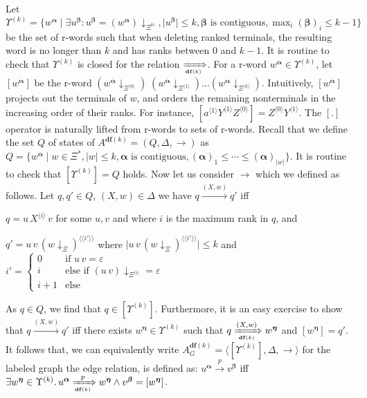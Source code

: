 \documentclass[final]{llncs}
\def\age#1{\left[#1\right]}
\def\tuple#1{{\langle #1 \rangle}}
\def\nats{{\mathbb{N}}}
\def\len#1{{\vert{#1}\vert}}
\def\prod{\Delta}
\def\df#1{\scriptscriptstyle\mathbf{df}(#1)}
\def\Vars{\ensuremath{\Xi}}
\def\rank#1{\langle\!\langle#1\rangle\!\rangle}
\def\bdwords{\Upsilon}
\def\proj{\mathbin{\downarrow}}
\renewcommand{\proj}[2]{{#1}\mathclose{\downarrow}_{{#2}}}
\begin{document}
Let \(\bdwords^{(k)}
= \{w^{\boldsymbol{\alpha}} \mid \exists  u^{\boldsymbol{\beta}}\colon u^{\boldsymbol{\beta}} = \proj{(w^{\boldsymbol{\alpha}})}{\Vars^{\nats}}, \len{u^{\boldsymbol{\beta}}} \leq  k, \boldsymbol{\beta} \text{ is contiguous}, \max_{i} (\boldsymbol{\beta})_i \leq k-1\} \) be the set of r-words such
that when deleting ranked terminals, the resulting word is no longer than \(k\) and has ranks between $0$ and $k-1$. 
It is routine to check that \(\bdwords^{(k)}\) is closed for the relation \(\xRightarrow[\df{k}]{}\).
For a
r-word \(w^{\boldsymbol{\alpha}}\in\bdwords^{(k)}\),
let \(\age{w^{\boldsymbol{\alpha}}}\) be the r-word
\( (\proj{w^{\boldsymbol{\alpha}}}{\Vars^{\tuple{0}}})\;
(\proj{w^{\boldsymbol{\alpha}}}{\Vars^{\tuple{1}}})
\ldots (\proj{w^{\boldsymbol{\alpha}}}{\Vars^{\tuple{k}}})\).
Intuitively, \(\age{w^{\boldsymbol{\alpha}}}\) projects out the
terminals of \(w\), and orders the remaining nonterminals in the
increasing order of their ranks. For instance, 
\(\age{a^{\tuple{1}}Y^{\tuple{1}}Z^{\tuple{0}}} = Z^{\tuple{0}} Y^{\tuple{1}}\). 
The $\age{.}$ operator is naturally lifted from r-words to sets of r-words.
Recall that we define the set \(Q\) of states of \(A^{\df{k}} = (Q,\prod,\rightarrow)\) as
\(Q = \{ w^{\boldsymbol{\alpha}} \mid w \in \Vars^{*}, \len{w}\leq k, \boldsymbol{\alpha} \text{ is contiguous},
(\boldsymbol{\alpha})_1 \leq \cdots \leq (\boldsymbol{\alpha})_{\len{w}} \} \).
It is routine to check that \(\age{\bdwords^{(k)}} = Q\) holds.
Now let us consider \(\rightarrow\) which we defined as follows.
Let \(q,q' \in Q\), \( (X,w)\in \Delta\) we have \(q \xrightarrow{(X,w)} q'\) if{}f 
\begin{compactitem}
\item \( q = u\, X^{\tuple{i}}\, v\) for some \(u,v\) and where \(i\) is the maximum rank in \(q\), and 
\item \( q'= u\, v\, (\proj{w}{\Vars})^{\rank{i'}} \)
where \(\len{u\, v\, (\proj{w}{\Vars})^{\rank{i'}}}\leq k\) and \( i' = 
\begin{cases}
  0 & \text{if } u\, v = \varepsilon\\
	i & \text{else if } \proj{(u\, v)}{\Vars^{\tuple{i}}} = \varepsilon\\
	i+1 & \text{else}
\end{cases}\)
\end{compactitem}
As \(q\in Q\), we find that \(q\in \age{\bdwords^{(k)}}\). 
Furthermore, it is an easy exercise to show that  
\(q \xrightarrow{(X,w)} q'\) if{}f there exists \(w^{\boldsymbol{\eta}} \in \bdwords^{(k)}\) 
such that \(q \xRightarrow[\df{k}]{(X,w)}  w^{\boldsymbol{\eta}}\) and \( \age{ w^{\boldsymbol{\eta}} } = q'\).
It follows that, we can equivalently write $A^{\df{k}}_G
= \tuple{ \age{\bdwords^{(k)}}, \prod, \rightarrow}$ for the labeled
graph the edge relation, is defined as:
\(u^{\boldsymbol{\alpha}} \xrightarrow{p} v^{\boldsymbol{\beta}}\)
if{}f
\(\exists w^{\boldsymbol{\eta}} \in \bdwords^{(k)}  \ldotp
u^{\boldsymbol{\alpha}} \xRightarrow[\df{k}]{p}
w^{\boldsymbol{\eta}} \land v^{\boldsymbol{\beta}}
= \age{w^{\boldsymbol{\eta}}}\). 
\end{document}
